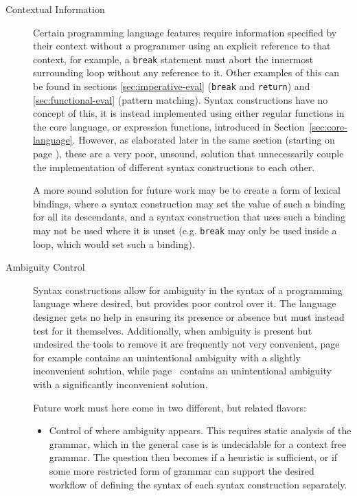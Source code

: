 \documentclass{kththesis}
\begin{document}
\begin{description}
  \item[Contextual Information] Certain programming language features require information specified by their context without a programmer using an explicit reference to that context, for example, a \texttt{break} statement must abort the innermost surrounding loop without any reference to it. Other examples of this can be found in sections \ref{sec:imperative-eval} (\texttt{break} and \texttt{return}) and \ref{sec:functional-eval} (pattern matching). Syntax constructions have no concept of this, it is instead implemented using either regular functions in the core language, or expression functions, introduced in Section~\ref{sec:core-language}. However, as elaborated later in the same section (starting on page \pageref{sec:efun-drawbacks}), these are a very poor, unsound, solution that unnecessarily couple the implementation of different syntax constructions to each other.

  A more sound solution for future work may be to create a form of lexical bindings, where a syntax construction may set the value of such a binding for all its descendants, and a syntax construction that uses such a binding may not be used where it is unset (e.g. \texttt{break} may only be used inside a loop, which would set such a binding).

  \item[Ambiguity Control] Syntax constructions allow for ambiguity in the syntax of a programming language where desired, but provides poor control over it. The language designer gets no help in ensuring its presence or absence but must instead test for it themselves. Additionally, when ambiguity is present but undesired the tools to remove it are frequently not very convenient, page~\pageref{sec:lua-func-call-precedence} for example contains an unintentional ambiguity with a slightly inconvenient solution, while page~\pageref{sec:ambiguous-lists} contains an unintentional ambiguity with a significantly inconvenient solution.

  Future work must here come in two different, but related flavors:
  \begin{itemize}
    \item Control of where ambiguity appears. This requires static analysis of the grammar, which in the general case is is undecidable for a context free grammar. The question then becomes if a heuristic is sufficient, or if some more restricted form of grammar can support the desired workflow of defining the syntax of each syntax construction separately.


\end{itemize}
\end{description}
\end{document}
